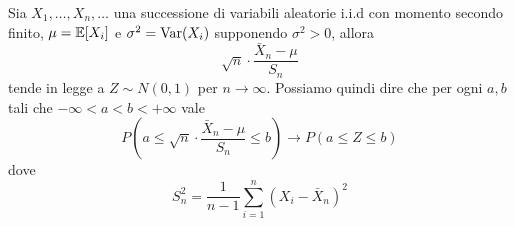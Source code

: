 \begin{proposition}\label{prop: tlc}
	Sia $X_1, \dots, X_n, \dots$ una successione di variabili aleatorie i.i.d con momento secondo
	finito, $\mu = \mathbb{E}[X_i]$ e $\sigma^2 = \operatorname{Var}(X_i)$ supponendo $\sigma^2 > 0$, allora
	\[ \sqrt{n} \cdot \frac{\bar{X}_n  - \mu}{S_n} \]
	tende in legge a $Z \sim N(0,1)$ per $n \to \infty$. Possiamo quindi dire che per ogni $a,b$
	tali che $-\infty < a < b < +\infty$ vale
	\[
		P \left( a \leq \sqrt{n} \cdot \frac{\bar{X}_n  - \mu}{S_n} \leq b \right) \to
		P(a \leq Z \leq b)
	\]
	dove
	\[ S_n^2 = \frac{1}{n-1} \sum_{i=1}^{n} (X_i - \bar{X}_n)^2 \]
\end{proposition}
